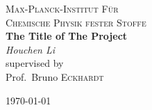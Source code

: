 \begin{titlepage}
	\centering
	{\scshape\LARGE Max-Planck-Institut F\"ur}\\
	\vspace{1cm}
	{\scshape\Large Chemische Physik fester Stoffe}\\
	\vspace{4cm}
	{\huge\bfseries The Title of The Project}\\
	\vspace{2cm}
	{\Large\itshape Houchen Li}\\
	\vfill
	supervised by\\
	Prof.~Bruno \textsc{Eckhardt}\\
	\vfill
	{\large \today\par}
\end{titlepage}
\restoregeometry
